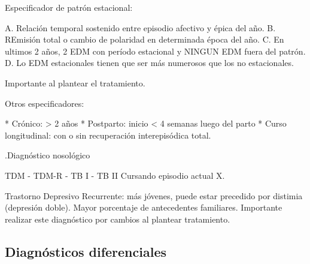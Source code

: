 \documentclass{scrbook}
\begin{document}
Especificador de patrón estacional:

A. Relación temporal sostenido entre episodio afectivo y épica del año.
B. REmisión total o cambio de polaridad en determinada época del año.
C. En ultimos 2 años, 2 EDM con período estacional y NINGUN EDM fuera del patrón.
D. Lo EDM estacionales tienen que ser más numerosos que los no estacionales.

Importante al plantear el tratamiento.

Otros especificadores:

* Crónico: > 2 años
* Postparto: inicio < 4 semanas luego del parto
* Curso longitudinal: con o sin recuperación interepisódica total.

.Diagnóstico nosológico

TDM - TDM-R - TB I - TB II
Cursando episodio actual X.

Trastorno Depresivo Recurrente: más jóvenes, puede estar precedido por distimia (depresión doble). Mayor porcentaje de antecedentes familiares. Importante realizar este diagnóstico por cambios al plantear tratamiento.

\subsection*{Diagnósticos diferenciales}
\end{document}

